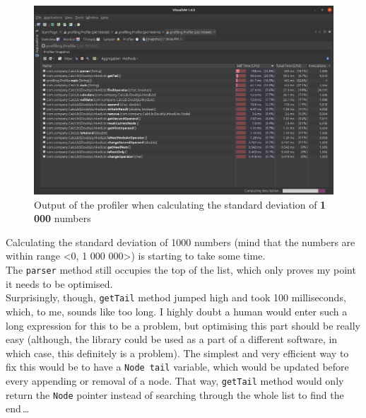 \documentclass[12pt]{article}
\begin{document}
    \begin{figure}
      \begin{center}
        \includegraphics[width=16cm]{profiling_result-1000_numbers.eps}
        \caption{Output of the profiler when calculating the standard deviation of \textbf{1 000} numbers}
      \end{center}
    \end{figure}

    Calculating the standard deviation of 1000 numbers (mind that the 
    numbers are within range \textless 0, 1 000 000\textgreater) is 
    starting to take some time. \\

    The \texttt{parser} method still occupies the top of the list, which
    only proves my point it needs to be optimised. \\

    Surprisingly, though, \texttt{getTail} method jumped high and took
    100 milliseconds, which, to me, sounds like too long. I highly doubt
    a human would enter such a long expression for this to be a problem,
    but optimising this part should be really easy (although, the library
    could be used as a part of a different software, in which case, this
    definitely is a problem). The simplest and very efficient way to fix
    this would be to have a \texttt{Node tail} variable, which would be
    updated before every appending or removal of a node. That way, 
    \texttt{getTail} method would only return the \texttt{Node} pointer
    instead of searching through the whole list to find the end\,\dots

    \newpage
\end{document}
